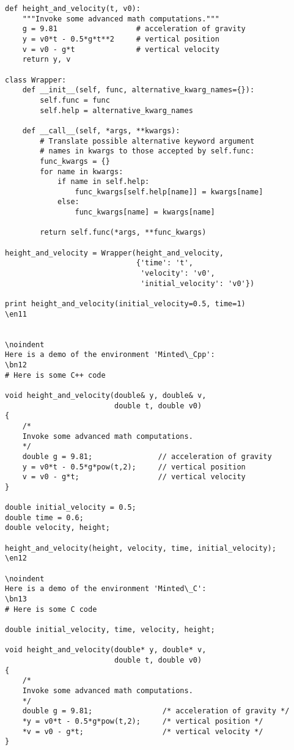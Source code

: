 \documentclass[a4paper,11pt]{article}
\begin{document}
{{{{{{{{{{{\begin{Verbatim}
def height_and_velocity(t, v0):
    """Invoke some advanced math computations."""
    g = 9.81                  # acceleration of gravity
    y = v0*t - 0.5*g*t**2     # vertical position
    v = v0 - g*t              # vertical velocity
    return y, v

class Wrapper:
    def __init__(self, func, alternative_kwarg_names={}):
        self.func = func
        self.help = alternative_kwarg_names

    def __call__(self, *args, **kwargs):
        # Translate possible alternative keyword argument
        # names in kwargs to those accepted by self.func:
        func_kwargs = {}
        for name in kwargs:
            if name in self.help:
                func_kwargs[self.help[name]] = kwargs[name]
            else:
                func_kwargs[name] = kwargs[name]

        return self.func(*args, **func_kwargs)

height_and_velocity = Wrapper(height_and_velocity,
                              {'time': 't',
                               'velocity': 'v0',
                               'initial_velocity': 'v0'})

print height_and_velocity(initial_velocity=0.5, time=1)
\en11


\noindent
Here is a demo of the environment 'Minted\_Cpp':
\bn12
# Here is some C++ code

void height_and_velocity(double& y, double& v, 
                         double t, double v0)
{
    /*
    Invoke some advanced math computations.
    */
    double g = 9.81;               // acceleration of gravity
    y = v0*t - 0.5*g*pow(t,2);     // vertical position
    v = v0 - g*t;                  // vertical velocity
}

double initial_velocity = 0.5;
double time = 0.6;
double velocity, height;

height_and_velocity(height, velocity, time, initial_velocity);
\en12

\noindent
Here is a demo of the environment 'Minted\_C':
\bn13
# Here is some C code

double initial_velocity, time, velocity, height;

void height_and_velocity(double* y, double* v, 
                         double t, double v0)
{
    /*
    Invoke some advanced math computations.
    */
    double g = 9.81;                /* acceleration of gravity */
    *y = v0*t - 0.5*g*pow(t,2);     /* vertical position */
    *v = v0 - g*t;                  /* vertical velocity */
}


\end{Verbatim}}}}}}}}}}}}
\end{document}
